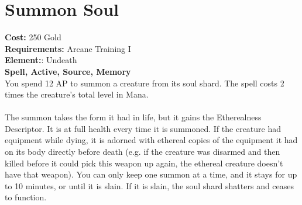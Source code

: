 \section*{Summon Soul}
\textbf{Cost:} 250 Gold\\
\textbf{Requirements:} Arcane Training I\\
\textbf{Element:}: Undeath\\
\textbf{Spell, Active, Source, Memory}\\
You spend 12 AP to summon a creature from its soul shard. The spell costs 2 times the creature’s total level in Mana.\\
\\
The summon takes the form it had in life, but it gains the Etherealness Descriptor. It is at full health every time it is summoned. If the creature had equipment while dying, it is adorned with ethereal copies of the equipment it had on its body directly before death (e.g. if the creature was disarmed and then killed before it could pick this weapon up again, the ethereal creature doesn’t have that weapon). You can only keep one summon at a time, and it stays for up to 10 minutes, or until it is slain. If it is slain, the soul shard shatters and ceases to function.\\